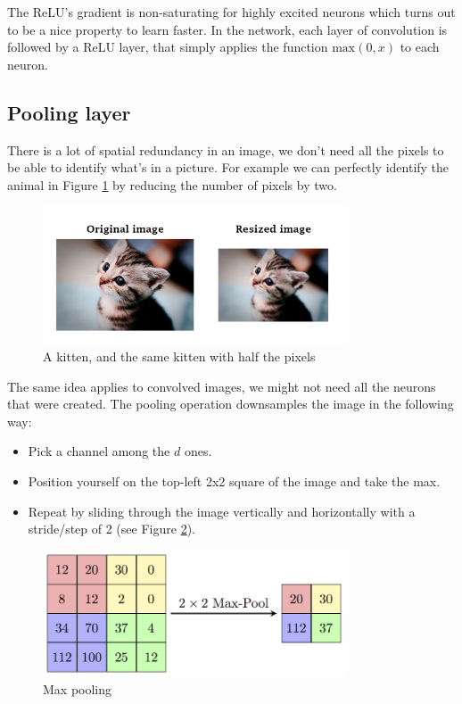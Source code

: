 The ReLU's gradient is non-saturating for highly excited neurons which turns out to be a nice property to learn faster. In the network, each layer of convolution is followed by a ReLU layer, that simply applies the function $\text{max}(0,x)$ to each neuron.

\newpage
\subsection{Pooling layer}
There is a lot of spatial redundancy in an image, we don't need all the pixels to be able to identify what's in a picture. For example we can perfectly identify the animal in Figure \ref{kittens} by reducing the number of pixels by two.

\begin{figure}[H]
\centering
\includegraphics[width=0.8\textwidth]{Images/kittens.png}
\caption{A kitten, and the same kitten with half the pixels}
\label{kittens}
\end{figure}

The same idea applies to convolved images, we might not need all the neurons that were created. The pooling operation downsamples the image in the following way:
\begin{itemize}
\item Pick a channel among the $d$ ones.
\item Position yourself on the top-left 2x2 square of the image and take the max.
\item Repeat by sliding through the image vertically and horizontally with a stride/step of 2 (see Figure \ref{maxpool}).
\end{itemize}

\begin{figure}[H]
\centering
\includegraphics[width=0.8\textwidth]{Images/maxpool.png}
\caption{Max pooling \cite{camb-spark}}
\label{maxpool}
\end{figure}

